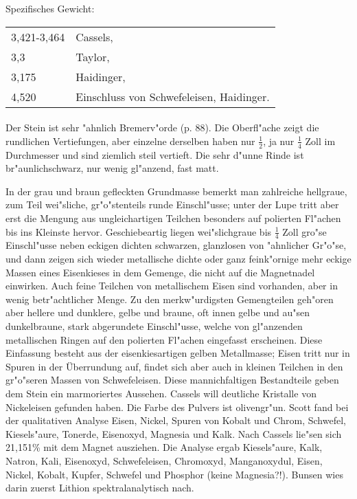\documentclass[a4paper, 11pt, oneside]{article}
\begin{document}
Spezifisches Gewicht:  
\begin{table}[!ht]
    \centering
    \begin{tabular}{l l}
        3,421-3,464 & Cassels,\\
        3,3 & Taylor,\\
        3,175 & Haidinger,\\
        4,520 & Einschluss von Schwefeleisen, Haidinger.
    \end{tabular}
\end{table}
\paragraph{}
Der Stein ist sehr "ahnlich Bremerv"orde (p. 88). Die Oberfl"ache zeigt die rundlichen Vertiefungen, aber einzelne derselben haben nur $\frac{1}{2}$, ja nur $\frac{1}{4}$ Zoll im Durchmesser und sind ziemlich steil vertieft. Die sehr d"unne Rinde ist br"aunlichschwarz, nur wenig gl"anzend, fast matt.

In der grau und braun gefleckten Grundmasse bemerkt man zahlreiche hellgraue, zum Teil wei"sliche, gr"o"stenteils runde Einschl"usse; unter der Lupe tritt aber erst die Mengung aus ungleichartigen Teilchen besonders auf polierten Fl"achen bis ins Kleinste hervor. Geschiebeartig liegen wei"slichgraue bis $\frac{1}{4}$ Zoll gro"se Einschl"usse neben eckigen dichten schwarzen, glanzlosen von "ahnlicher Gr"o"se, und dann zeigen sich wieder metallische dichte oder ganz feink"ornige mehr eckige Massen eines Eisenkieses in dem Gemenge, die nicht auf die Magnetnadel einwirken. Auch feine Teilchen von metallischem Eisen sind vorhanden, aber in wenig betr"achtlicher Menge. Zu den merkw"urdigsten Gemengteilen geh"oren aber hellere und dunklere, gelbe und braune, oft innen gelbe und au"sen dunkelbraune, stark abgerundete Einschl"usse, welche von gl"anzenden metallischen Ringen auf den polierten Fl"achen eingefasst erscheinen. Diese Einfassung besteht aus der eisenkiesartigen gelben Metallmasse; Eisen tritt nur in Spuren in der Überrundung auf, findet sich aber auch in kleinen Teilchen in den gr"o"seren Massen von Schwefeleisen. Diese mannichfaltigen Bestandteile geben dem Stein ein marmoriertes Aussehen. Cassels will deutliche Kristalle von Nickeleisen gefunden haben. Die Farbe des Pulvers ist olivengr"un. Scott fand bei der qualitativen Analyse Eisen, Nickel, Spuren von Kobalt und Chrom, Schwefel, Kiesels"aure, Tonerde, Eisenoxyd, Magnesia und Kalk. Nach Cassels lie"sen sich 21,151\% mit dem Magnet ausziehen. Die Analyse ergab Kiesels"aure, Kalk, Natron, Kali, Eisenoxyd, Schwefeleisen, Chromoxyd, Manganoxydul, Eisen, Nickel, Kobalt, Kupfer, Schwefel und Phosphor (keine Magnesia?!). Bunsen wies darin zuerst Lithion spektralanalytisch nach.
\end{document}
